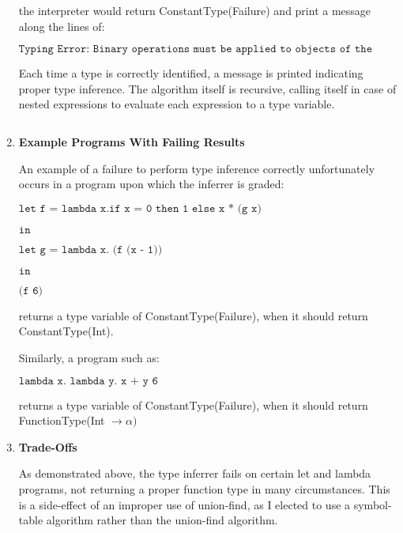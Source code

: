 \documentclass[10pt]{article} %
\begin{document}
\begin{enumerate}
the interpreter would return ConstantType(Failure) and print a message along the lines of:

$\texttt{Typing Error: Binary operations must be applied to objects of the same type}$ 
 
Each time a type is correctly identified, a message is printed indicating proper type inference.  The algorithm itself is recursive, calling itself in case of nested expressions to evaluate each expression to a type variable.

$$ $$

\item{\bf{Example Programs With Failing Results}}

An example of a failure to perform type inference correctly unfortunately occurs in a program upon which the inferrer is graded:

$\texttt{let f = lambda x.if x = 0 then 1 else x * (g x)}$

$\texttt{in}$

$\texttt{let g = lambda x. (f (x - 1))}$
 
$\texttt{in}$
  
$\texttt{(f 6)}$

returns a type variable of ConstantType(Failure), when it should return ConstantType(Int).

Similarly, a program such as:

$\texttt{lambda x. lambda y. x + y 6}$

returns a type variable of ConstantType(Failure), when it should return FunctionType(Int $\to \alpha)$

\item{\bf{Trade-Offs}}

As demonstrated above, the type inferrer fails on certain let and lambda programs, not returning a proper function type in many circumstances.  This is a side-effect of an improper use of union-find, as I elected to use a symbol-table algorithm rather than the union-find algorithm.  

\end{enumerate}
\end{document}
